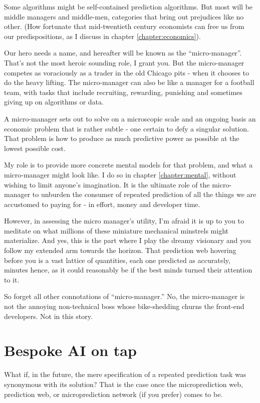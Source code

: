 Some algorithms might be self-contained prediction algorithms. But most will be middle managers and middle-men, categories that bring out prejudices like no other. (How fortunate that mid-twentieth century economists can free us from our predispositions, as I discuss in chapter \ref{chapter:economics}).

Our hero needs a name, and hereafter will be known as the ``micro-manager''. That's not the most heroic sounding role, I grant you. But the micro-manager competes as voraciously as a trader in the old Chicago pits - when it chooses to do the heavy lifting. The micro-manager can also be like a manager for a football team, with tasks that include recruiting, rewarding, punishing and sometimes giving up on algorithms or data. 

A micro-manager sets out to solve on a microscopic scale and an ongoing basis an economic problem that is rather subtle - one certain to defy a singular solution. That problem is how to produce as much predictive power as possible at the lowest possible cost.

My role is to provide more concrete mental models for that problem, and what a micro-manager might look like. I do so in chapter \ref{chapter:mental}, without wishing to limit anyone's imagination. It is the ultimate role of the micro-manager to unburden the consumer of repeated prediction of all the things we are accustomed to paying for - in effort, money and developer time. 


However, in assessing the micro manager's utility, I'm afraid it is up to you to meditate on what millions of these miniature mechanical minstrels might materialize. And yes, this is the part where I play the dreamy visionary and you follow my extended arm towards the horizon. That prediction web hovering before you is a vast lattice of quantities, each one predicted as accurately, minutes hence, as it could reasonably be if the best minds turned their attention to it. 


So forget all other connotations of ``micro-manager.'' No, the micro-manager is not the annoying non-technical boss whose bike-shedding churns the front-end developers. Not in this story. 



\section{Bespoke AI on tap}

What if, in the future, the mere specification of a repeated prediction task was synonymous with its solution? That is the case once the microprediction web, prediction web, or microprediction network (if you prefer) comes to be. 


